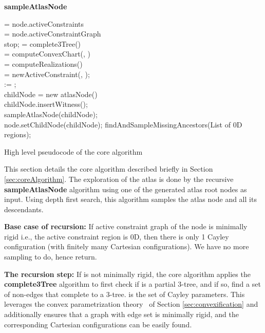 \documentclass[]{article}
\begin{document}
\begin{algorithm} [htbp]
 {\bf sampleAtlasNode}\\
 \BlankLine

	 = node.activeConstraints\\
	 = node.activeConstraintGraph\\
		{stop;	}
	 = complete3Tree()\\
	
	 = computeConvexChart(, )\\

	{
		 = computeRealizations()\\

		{
			{
				{
					 = newActiveConstraint(, );\\
					 :=  ;\\
					{
						childNode = new atlasNode()\\
						childNode.insertWitness();\\
						sampleAtlasNode(childNode);\\
					} 
					node.setChildNode(childNode);
				} 
			}
		}
	}
		findAndSampleMissingAncestors(List of 0D regions);
\caption{High level pseudocode of the core algorithm}
\label{alg:sampleAtlasNode}
\end{algorithm}
This section details the core algorithm described briefly in Section
\ref{sec:coreAlgorithm}.  The exploration of the atlas is done by the recursive
\textbf{sampleAtlasNode} algorithm using one of the generated atlas root nodes
as input. Using depth first search, this algorithm samples the atlas node and
all its descendants. 


\noindent\textbf{Base case of recursion:} If active constraint graph  of
the node is minimally rigid i.e., the active constraint region is 0D, then
there is only 1 Cayley configuration (with finitely many Cartesian
configurations).  We have no more sampling to do, hence return.

\noindent\textbf{The recursion step:} If  is not minimally rigid, the
core algorithm applies the \textbf{complete3Tree} algorithm  
to first check if  is a partial 3-tree, and if so, find a set of non-edges  that complete  to a 3-tree.
 is the set of Cayley parameters.
This leverages the convex parametrization theory~\cite{SiGa:2010} of Section
\ref{sec:convexification} and additionally ensures that a graph with edge set 
is minimally rigid, and the corresponding Cartesian configurations can be easily found. 
\end{document}

